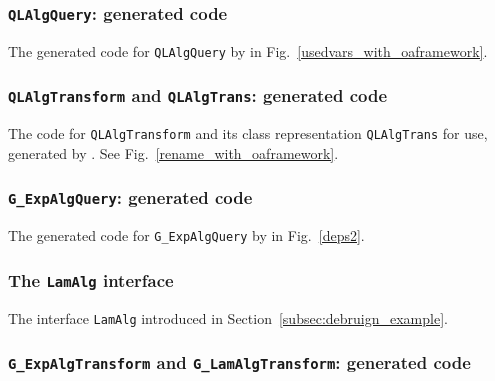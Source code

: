 \subsubsection{\lstinline{QLAlgQuery}: generated code}\label{subsec:appendix_code_qlalgquery}

The generated code for \lstinline{QLAlgQuery} by \Name in Fig.~\ref{usedvars_with_oaframework}.


\subsubsection{\lstinline{QLAlgTransform} and \lstinline{QLAlgTrans}: generated code}\label{subsec:appendix_code_qlalgtransform}

The code for \lstinline{QLAlgTransform} and its class representation \lstinline{QLAlgTrans} for use, generated by \Name. See Fig.~\ref{rename_with_oaframework}.


\subsubsection{\lstinline{G_ExpAlgQuery}: generated code}\label{subsec:appendix_code_g_expalgquery}

The generated code for \lstinline{G_ExpAlgQuery} by \Name in Fig.~\ref{deps2}.


\subsubsection{The \lstinline{LamAlg} interface}\label{subsec:appendix_lamalg_interface}

The interface \lstinline{LamAlg} introduced in Section~\ref{subsec:debruign_example}.


\subsubsection{\lstinline{G_ExpAlgTransform} and \lstinline{G_LamAlgTransform}: generated code}\label{subsec:appendix_code_g_explam_transform}

